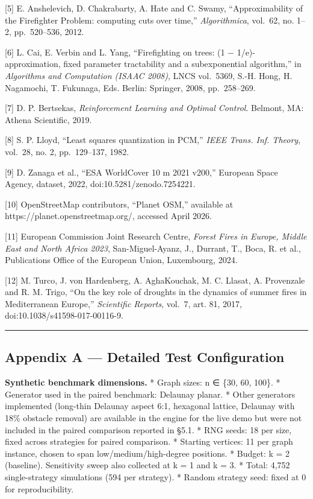 \documentclass[
  11pt,
]{article}
\begin{document}
{[}5{]} E. Anshelevich, D. Chakrabarty, A. Hate and C. Swamy,
``Approximability of the Firefighter Problem: computing cuts over
time,'' \emph{Algorithmica}, vol.~62, no. 1--2, pp.~520--536, 2012.

{[}6{]} L. Cai, E. Verbin and L. Yang, ``Firefighting on trees: (1 −
1/e)-approximation, fixed parameter tractability and a subexponential
algorithm,'' in \emph{Algorithms and Computation (ISAAC 2008)}, LNCS
vol.~5369, S.-H. Hong, H. Nagamochi, T. Fukunaga, Eds. Berlin: Springer,
2008, pp.~258--269.

{[}7{]} D. P. Bertsekas, \emph{Reinforcement Learning and Optimal
Control}. Belmont, MA: Athena Scientific, 2019.

{[}8{]} S. P. Lloyd, ``Least squares quantization in PCM,'' \emph{IEEE
Trans. Inf. Theory}, vol.~28, no. 2, pp.~129--137, 1982.

{[}9{]} D. Zanaga et al., ``ESA WorldCover 10 m 2021 v200,'' European
Space Agency, dataset, 2022, doi:10.5281/zenodo.7254221.

{[}10{]} OpenStreetMap contributors, ``Planet OSM,'' available at
https://planet.openstreetmap.org/, accessed April 2026.

{[}11{]} European Commission Joint Research Centre, \emph{Forest Fires
in Europe, Middle East and North Africa 2023}, San-Miguel-Ayanz, J.,
Durrant, T., Boca, R. et al., Publications Office of the European Union,
Luxembourg, 2024.

{[}12{]} M. Turco, J. von Hardenberg, A. AghaKouchak, M. C. Llasat, A.
Provenzale and R. M. Trigo, ``On the key role of droughts in the
dynamics of summer fires in Mediterranean Europe,'' \emph{Scientific
Reports}, vol.~7, art. 81, 2017, doi:10.1038/s41598-017-00116-9.

\begin{center}\rule{0.5\linewidth}{0.5pt}\end{center}

\subsection{Appendix A --- Detailed Test
Configuration}\label{appendix-a-detailed-test-configuration}

\textbf{Synthetic benchmark dimensions.} * Graph sizes: n ∈ \{30, 60,
100\}. * Generator used in the paired benchmark: Delaunay planar. *
Other generators implemented (long-thin Delaunay aspect 6:1, hexagonal
lattice, Delaunay with 18\% obstacle removal) are available in the
engine for the live demo but were not included in the paired comparison
reported in §5.1. * RNG seeds: 18 per size, fixed across strategies for
paired comparison. * Starting vertices: 11 per graph instance, chosen to
span low/medium/high-degree positions. * Budget: k = 2 (baseline).
Sensitivity sweep also collected at k = 1 and k = 3. * Total: 4,752
single-strategy simulations (594 per strategy). * Random strategy seed:
fixed at 0 for reproducibility.
\end{document}
